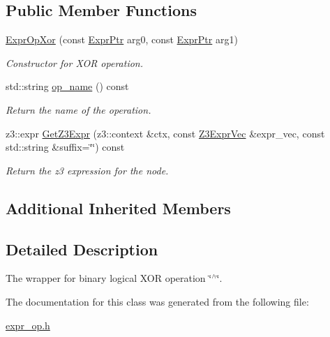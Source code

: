 \subsection*{Public Member Functions}
\begin{DoxyCompactItemize}
\item 
\mbox{\label{classilang_1_1_expr_op_xor_acb3b6aff53d074b40c728cd67e4087ab}} 
\mbox{\hyperlink{classilang_1_1_expr_op_xor_acb3b6aff53d074b40c728cd67e4087ab}{Expr\+Op\+Xor}} (const \mbox{\hyperlink{classilang_1_1_expr_a85952b6a34620c4c8cab6bac9c9fdf8c}{Expr\+Ptr}} arg0, const \mbox{\hyperlink{classilang_1_1_expr_a85952b6a34620c4c8cab6bac9c9fdf8c}{Expr\+Ptr}} arg1)
\begin{DoxyCompactList}\small\item\em Constructor for X\+OR operation. \end{DoxyCompactList}\item 
\mbox{\label{classilang_1_1_expr_op_xor_a547dc9b9c6bf1656cb1dbb8d8b8a0a3e}} 
std\+::string \mbox{\hyperlink{classilang_1_1_expr_op_xor_a547dc9b9c6bf1656cb1dbb8d8b8a0a3e}{op\+\_\+name}} () const
\begin{DoxyCompactList}\small\item\em Return the name of the operation. \end{DoxyCompactList}\item 
\mbox{\label{classilang_1_1_expr_op_xor_a0cecea709b3916b38e1c1fb3e5543902}} 
z3\+::expr \mbox{\hyperlink{classilang_1_1_expr_op_xor_a0cecea709b3916b38e1c1fb3e5543902}{Get\+Z3\+Expr}} (z3\+::context \&ctx, const \mbox{\hyperlink{namespaceilang_adc4eee919aa24fff882d03a48d733c19}{Z3\+Expr\+Vec}} \&expr\+\_\+vec, const std\+::string \&suffix=\char`\"{}\char`\"{}) const
\begin{DoxyCompactList}\small\item\em Return the z3 expression for the node. \end{DoxyCompactList}\end{DoxyCompactItemize}
\subsection*{Additional Inherited Members}


\subsection{Detailed Description}
The wrapper for binary logical X\+OR operation \char`\"{}$^\wedge$\char`\"{}. 

The documentation for this class was generated from the following file\+:\begin{DoxyCompactItemize}
\item 
\mbox{\hyperlink{expr__op_8h}{expr\+\_\+op.\+h}}\end{DoxyCompactItemize}

